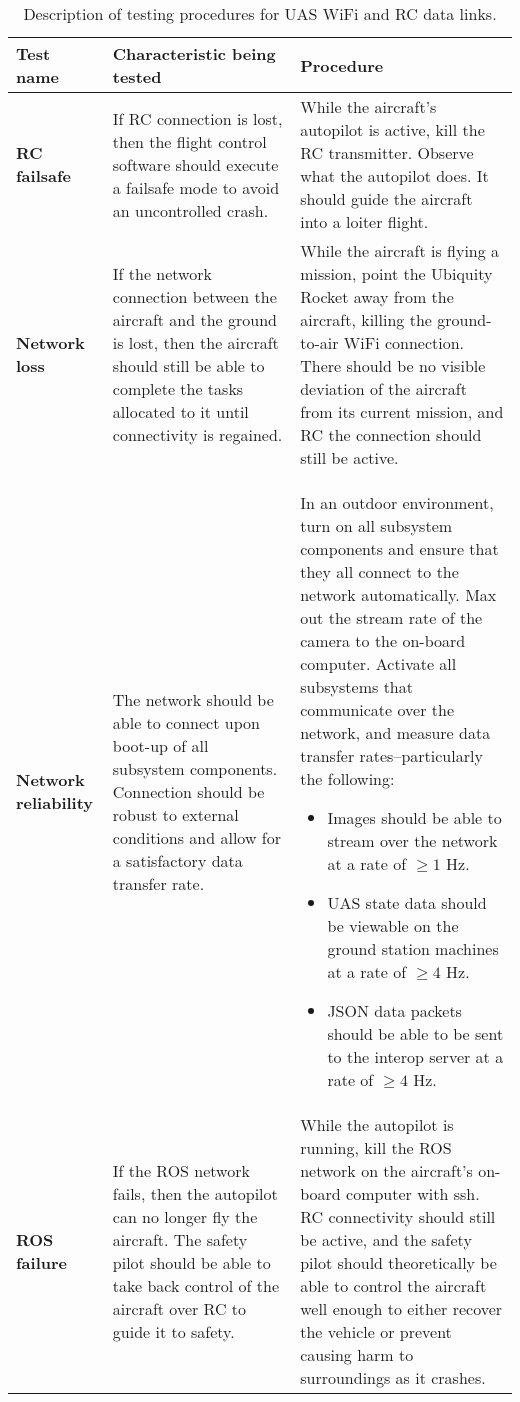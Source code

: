 \documentclass[]{auvsi_doc}
\begin{document}
\begin{center}
	\begin{longtable}[H]{|P{3cm}|P{5.75cm}|P{5.75cm}|}
		\caption{Description of testing procedures for UAS WiFi and RC data links.}
		\label{tab:sstests}\\
		\hline
		{\color[HTML]{000000} \textbf{Test name}} & {\color[HTML]{000000}\textbf{Characteristic being tested}}	& {\color[HTML]{000000}\textbf{Procedure}} \\
		\hline
		\textbf{RC failsafe}	& If RC connection is lost, then the flight control software should execute a failsafe mode to avoid an uncontrolled crash. &	While the aircraft's autopilot is active, kill the RC transmitter. Observe what the autopilot does. It should guide the aircraft into a loiter flight. \\
		\hline
		\textbf{Network loss}	& If the network connection between the aircraft and the ground is lost, then the aircraft should still be able to complete the tasks allocated to it until connectivity is regained. &	While the aircraft is flying a mission, point the Ubiquity Rocket away from the aircraft, killing the ground-to-air WiFi connection. There should be no visible deviation of the aircraft from its current mission, and RC the connection should still be active. \\
		\hline
		\textbf{Network reliability}	& The network should be able to connect upon boot-up of all subsystem components. Connection should be robust to external conditions and allow for a satisfactory data transfer rate. &	In an outdoor environment, turn on all subsystem components and ensure that they all connect to the network automatically. Max out the stream rate of the camera to the on-board computer. Activate all subsystems that communicate over the network, and measure data transfer rates--particularly the following: \begin{itemize}
			\item Images should be able to stream over the network at a rate of $\geq 1$ Hz.
			\item UAS state data should be viewable on the ground station machines at a rate of  $\geq 4$ Hz.
			\item JSON data packets should be able to be sent to the interop server at a rate of $\geq 4$ Hz.
		\end{itemize} \\
		\hline
		\textbf{ROS failure}	& If the ROS network fails, then the autopilot can no longer fly the aircraft. The safety pilot should be able to take back control of the aircraft over RC to guide it to safety. &	While the autopilot is running, kill the ROS network on the aircraft's on-board computer with ssh. RC connectivity should still be active, and the safety pilot should theoretically be able to control the aircraft well enough to either recover the vehicle or prevent causing harm to surroundings as it crashes. \\
		\hline
	\end{longtable}
\end{center}
\end{document}
